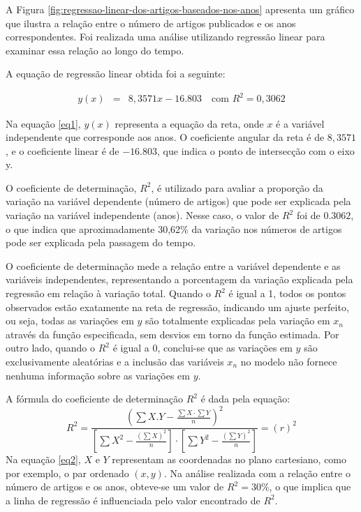 A Figura \ref{fig:regressao-linear-dos-artigos-baseados-nos-anos} apresenta um gráfico que ilustra a relação entre o número de artigos publicados e os anos correspondentes. Foi realizada uma análise utilizando regressão linear para examinar essa relação ao longo do tempo.

A equação de regressão linear obtida foi a seguinte:

\begin{eqnarray}
	y(x) &=& 8,3571x - 16.803 \quad \text{com } R^2 = 0,3062\label{eq1}
\end{eqnarray}

Na equação \eqref{eq1}, $y(x)$ representa a equação da reta, onde $x$ é a variável independente que corresponde aos anos. O coeficiente angular da reta é de $8,3571$, e o coeficiente linear é de $-16.803$, que indica o ponto de intersecção com o eixo y.

O coeficiente de determinação, $R^2$, é utilizado para avaliar a proporção da variação na variável dependente (número de artigos) que pode ser explicada pela variação na variável independente (anos). Nesse caso, o valor de $R^2$ foi de $0.3062$, o que indica que aproximadamente 30,62\% da variação nos números de artigos pode ser explicada pela passagem do tempo.

O coeficiente de determinação mede a relação entre a variável dependente e as variáveis independentes, representando a porcentagem da variação explicada pela regressão em relação à variação total. Quando o $R^2$ é igual a 1, todos os pontos observados estão exatamente na reta de regressão, indicando um ajuste perfeito, ou seja, todas as variações em $y$ são totalmente explicadas pela variação em $x_n$ através da função especificada, sem desvios em torno da função estimada. Por outro lado, quando o $R^2$ é igual a 0, conclui-se que as variações em $y$ são exclusivamente aleatórias e a inclusão das variáveis $x_n$ no modelo não fornece nenhuma informação sobre as variações em $y$.

A fórmula do coeficiente de determinação $R^2$ é dada pela equação:
\begin{equation}
	R^{2}=\frac{\left(\sum X . Y-\frac{\sum X \cdot \sum Y}{n}\right)^{2}}{\left[\sum X^{2}-\frac{\left(\sum X\right)^{2}}{n}\right] \cdot\left[\sum Y^{2}-\frac{\left(\sum Y\right)^{2}}{n}\right]}=(r)^{2}\label{eq2}
\end{equation}
Na equação \eqref{eq2}, $X$ e $Y$ representam as coordenadas no plano cartesiano, como por exemplo, o par ordenado $(x,y)$. Na análise realizada com a relação entre o número de artigos e os anos, obteve-se um valor de $R^2=30\%$, o que implica que a linha de regressão é influenciada pelo valor encontrado de $R^2$.

